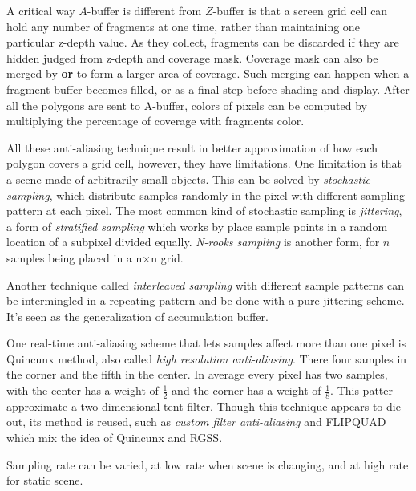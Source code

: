 \documentclass[10pt, a4paper]{article}
\begin{document}
                    A critical way $A$-buffer is different from $Z$-buffer is that a screen grid cell can hold any number of fragments at one time, rather than maintaining one particular z-depth value. As they collect, fragments can be discarded if they are hidden judged from z-depth and coverage mask. Coverage mask can also be merged by \textbf{or} to form a larger area of coverage. Such merging can happen when a fragment buffer becomes filled, or as a final step before shading and display. After all the polygons are sent to A-buffer, colors of pixels can be computed by multiplying the percentage of coverage with fragments color. 

                    All these anti-aliasing technique result in better approximation of how each polygon covers a grid cell, however, they have limitations. One limitation is that a scene made of arbitrarily small objects. This can be solved by \emph{stochastic sampling}, which distribute samples randomly in the pixel with different sampling pattern at each pixel. The most common kind of stochastic sampling is \emph{jittering}, a form of \emph{stratified sampling} which works by place sample points in a random location of a subpixel divided equally. \emph{N-rooks sampling} is another form, for $n$ samples being placed in a  n$ \times $n grid. 
                    
                    Another technique called \emph{interleaved sampling} with different sample patterns can be intermingled in a repeating pattern and be done with a pure jittering scheme. It's seen as the generalization of accumulation buffer. 
                    
                    One real-time anti-aliasing scheme that lets samples affect more than one pixel is Quincunx method, also called \emph{high resolution anti-aliasing}. There four samples in the corner and the fifth in the center. In average every pixel has two samples, with the center has a weight of $\frac{1}{2}$ and the corner has a weight of $\frac{1}{8}$. This patter approximate a two-dimensional tent filter. Though this technique appears to die out, its method is reused, such as \emph{custom filter anti-aliasing} and FLIPQUAD which mix the idea of Quincunx and RGSS. 

                    Sampling rate can be varied, at low rate when scene is changing, and at high rate for static scene. 
\end{document}
